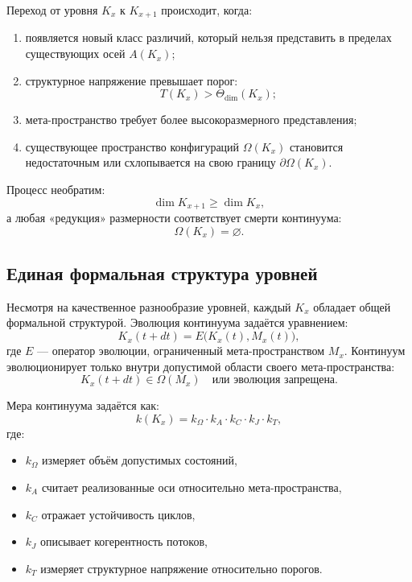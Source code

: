 Переход от уровня $K_x$ к $K_{x+1}$ происходит, когда:
\begin{enumerate}
    \item появляется новый класс различий, который нельзя представить
          в пределах существующих осей $A(K_x)$;
    \item структурное напряжение превышает порог:
    \[
        T(K_x) > \Theta_{\mathrm{dim}}(K_x);
    \]
    \item мета-пространство требует более высокоразмерного представления;
    \item существующее пространство конфигураций $\Omega(K_x)$ становится
          недостаточным или схлопывается на свою границу $\partial\Omega(K_x)$.
\end{enumerate}

Процесс необратим:
\[
\dim K_{x+1} \ge \dim K_x,
\]
а любая «редукция» размерности соответствует смерти континуума:
\[
\Omega(K_x) = \varnothing.
\]


\subsection{Единая формальная структура уровней}

Несмотря на качественное разнообразие уровней, каждый $K_x$ обладает общей
формальной структурой.
Эволюция континуума задаётся уравнением:
\[
K_x(t + dt) = E\bigl(K_x(t), M_x(t)\bigr),
\]
где $E$ — оператор эволюции, ограниченный мета-пространством
$M_x$.
Континуум эволюционирует только внутри допустимой области своего
мета-пространства:
\[
K_x(t+dt) \in \Omega(M_x)
\quad\text{или эволюция запрещена}.
\]

Мера континуума задаётся как:
\[
k(K_x) =
k_{\Omega} \cdot k_{A} \cdot k_{C} \cdot k_{J} \cdot k_{T},
\]
где:
\begin{itemize}
    \item $k_{\Omega}$ измеряет объём допустимых состояний,
    \item $k_{A}$ считает реализованные оси относительно мета-пространства,
    \item $k_{C}$ отражает устойчивость циклов,
    \item $k_{J}$ описывает когерентность потоков,
    \item $k_{T}$ измеряет структурное напряжение относительно порогов.
\end{itemize}


